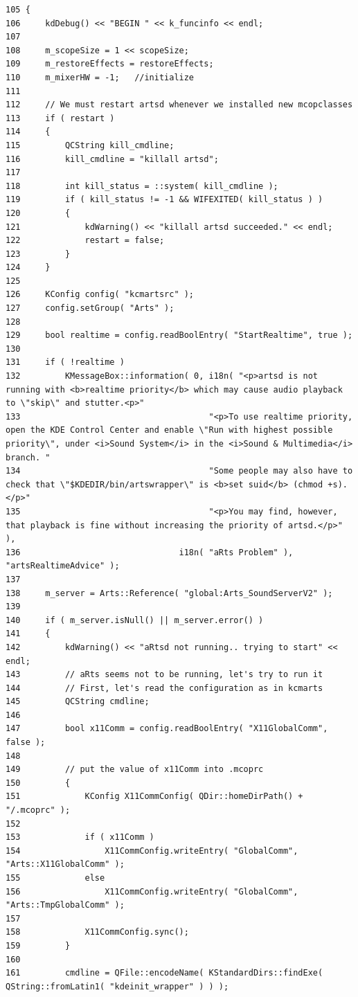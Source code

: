 \footnotesize\begin{verbatim}105 {
106     kdDebug() << "BEGIN " << k_funcinfo << endl;
107 
108     m_scopeSize = 1 << scopeSize;   
109     m_restoreEffects = restoreEffects;
110     m_mixerHW = -1;   //initialize
111 
112     // We must restart artsd whenever we installed new mcopclasses
113     if ( restart )
114     {
115         QCString kill_cmdline;
116         kill_cmdline = "killall artsd";
117 
118         int kill_status = ::system( kill_cmdline );
119         if ( kill_status != -1 && WIFEXITED( kill_status ) )
120         {
121             kdWarning() << "killall artsd succeeded." << endl;
122             restart = false;
123         }
124     }
125 
126     KConfig config( "kcmartsrc" );
127     config.setGroup( "Arts" );
128 
129     bool realtime = config.readBoolEntry( "StartRealtime", true );
130 
131     if ( !realtime )
132         KMessageBox::information( 0, i18n( "<p>artsd is not running with <b>realtime priority</b> which may cause audio playback to \"skip\" and stutter.<p>"
133                                      "<p>To use realtime priority, open the KDE Control Center and enable \"Run with highest possible priority\", under <i>Sound System</i> in the <i>Sound & Multimedia</i> branch. "
134                                      "Some people may also have to check that \"$KDEDIR/bin/artswrapper\" is <b>set suid</b> (chmod +s).</p>"
135                                      "<p>You may find, however, that playback is fine without increasing the priority of artsd.</p>" ),
136                                i18n( "aRts Problem" ), "artsRealtimeAdvice" );
137 
138     m_server = Arts::Reference( "global:Arts_SoundServerV2" );
139 
140     if ( m_server.isNull() || m_server.error() )
141     {
142         kdWarning() << "aRtsd not running.. trying to start" << endl;
143         // aRts seems not to be running, let's try to run it
144         // First, let's read the configuration as in kcmarts
145         QCString cmdline;
146 
147         bool x11Comm = config.readBoolEntry( "X11GlobalComm", false );
148 
149         // put the value of x11Comm into .mcoprc
150         {
151             KConfig X11CommConfig( QDir::homeDirPath() + "/.mcoprc" );
152 
153             if ( x11Comm )
154                 X11CommConfig.writeEntry( "GlobalComm", "Arts::X11GlobalComm" );
155             else
156                 X11CommConfig.writeEntry( "GlobalComm", "Arts::TmpGlobalComm" );
157 
158             X11CommConfig.sync();
159         }
160 
161         cmdline = QFile::encodeName( KStandardDirs::findExe( QString::fromLatin1( "kdeinit_wrapper" ) ) );

\end{verbatim}
